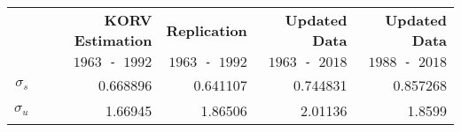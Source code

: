 \begin{tabular}{rrrrr}
  \hline\hline
   & \textbf{KORV Estimation} & \textbf{Replication} & \textbf{Updated Data} & \textbf{Updated Data} \\
   & \texttt{$1963$ - $1992$} & \texttt{$1963$ - $1992$} & \texttt{$1963$ - $2018$} & \texttt{$1988$ - $2018$} \\\hline
  $\sigma_s$ & 0.668896 & 0.641107 & 0.744831 & 0.857268 \\
  $\sigma_u$ & 1.66945 & 1.86506 & 2.01136 & 1.8599 \\\hline\hline
\end{tabular}
